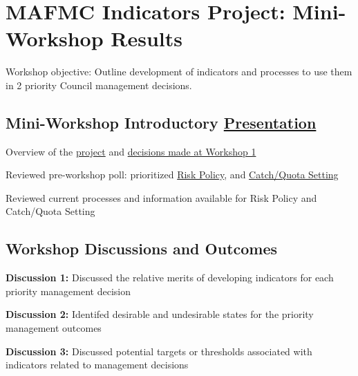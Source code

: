 \documentclass[
]{article}
\author{}
\date{\vspace{-2.5em}}
\begin{document}
\vspace{-1cm}

\section{MAFMC Indicators Project: Mini-Workshop
Results}\label{mafmc-indicators-project-mini-workshop-results}

Workshop objective: Outline development of indicators and processes to
use them in 2 priority Council management decisions.

\subsection{\texorpdfstring{Mini-Workshop Introductory
\href{https://sgaichas.github.io/HSpresentations/20260331_ProjectOverview_MiniWK_Gaichas.html}{Presentation}}{Mini-Workshop Introductory Presentation}}\label{mini-workshop-introductory-presentation}

\begin{noteblock}
Overview of the
\href{https://www.mafmc.org/s/Project-5_IRA-Project-Brief.pdf}{project}
and \href{https://www.mafmc.org/s/WK1_Results-Summary.pdf}{decisions
made at Workshop 1}

Reviewed pre-workshop poll: prioritized
\href{https://www.mafmc.org/s/3_MiniWK_RiskPolicy.pdf}{Risk Policy}, and
\href{https://www.mafmc.org/s/4_MiniWK_CatchQuotas.pdf}{Catch/Quota
Setting}

Reviewed current processes and information available for Risk Policy and
Catch/Quota Setting

\end{noteblock}

\begin{ltgreenbox}

\subsection{Workshop Discussions and
Outcomes}\label{workshop-discussions-and-outcomes}

\textbf{Discussion 1:} Discussed the relative merits of developing
indicators for each priority management decision

\textbf{Discussion 2:} Identifed desirable and undesirable states for
the priority management outcomes

\textbf{Discussion 3:} Discussed potential targets or thresholds
associated with indicators related to management decisions

\end{ltgreenbox}
\end{document}
